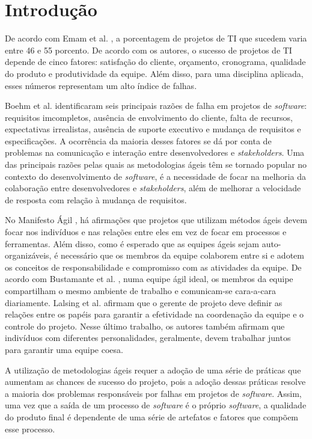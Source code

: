 \chapter{Introdução}
\label{intro}

De acordo com Emam et al. \cite{emam}, a porcentagem de projetos de TI que sucedem varia entre 46 e 55 porcento. De acordo com os autores, o sucesso de projetos de TI depende de cinco fatores: satisfação do cliente, orçamento, cronograma, qualidade do produto e produtividade da equipe. Além disso, para uma disciplina aplicada, esses números representam um alto índice de falhas.

Boehm et al. \cite{boehm} identificaram seis principais razões de falha em projetos de \textit{software}: requisitos imcompletos, ausência de envolvimento do cliente, falta de recursos, expectativas irrealistas, ausência de suporte executivo e mudança de requisitos e especificações. A ocorrência da maioria desses fatores se dá por conta de problemas na comunicação e interação entre desenvolvedores e \textit{stakeholders}. Uma das principais razões pelas quais as metodologias ágeis têm se tornado popular no contexto do desenvolvimento de \textit{software}, é a necessidade de focar na melhoria da colaboração entre desenvolvedores e \textit{stakeholders}, além de melhorar a velocidade de resposta com relação à mudança de requisitos.

No Manifesto Ágil \cite{manifesto}, há afirmações que projetos que utilizam métodos ágeis devem focar nos indivíduos e nas relações entre eles em vez de focar em processos e ferramentas. Além disso, como é esperado que as equipes ágeis sejam auto-organizáveis, é necessário que os membros da equipe colaborem entre si e adotem os conceitos de responsabilidade e compromisso com as atividades da equipe. De acordo com Bustamante et al. \cite{bustamante}, numa equipe ágil ideal, os membros da equipe compartilham o mesmo ambiente de trabalho e comunicam-se cara-a-cara diariamente. Lalsing et al. \cite{lalsing} afirmam que o gerente de projeto deve definir as relações entre os papéis para garantir a efetividade na coordenação da equipe e o controle do projeto. Nesse último trabalho, os autores também afirmam que indivíduos com diferentes personalidades, geralmente, devem trabalhar juntos para garantir uma equipe coesa.

A utilização de metodologias ágeis requer a adoção de uma série de práticas que aumentam as chances de sucesso do projeto, pois a adoção dessas práticas resolve a maioria dos problemas responsáveis por falhas em projetos de \textit{software}. Assim, uma vez que a saída de um processo de \textit{software} é o próprio \textit{software}, a qualidade do produto final é dependente de uma série de artefatos e fatores que compõem esse processo.

